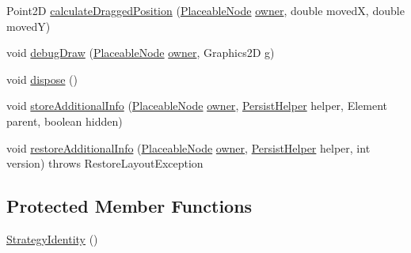\begin{DoxyCompactItemize}
\item 
Point2\-D \hyperlink{classorg_1_1tzi_1_1use_1_1gui_1_1views_1_1diagrams_1_1elements_1_1positioning_1_1_strategy_identity_a8db2a4d3368ef4cd10c42804622a8aca}{calculate\-Dragged\-Position} (\hyperlink{classorg_1_1tzi_1_1use_1_1gui_1_1views_1_1diagrams_1_1elements_1_1_placeable_node}{Placeable\-Node} \hyperlink{classorg_1_1tzi_1_1use_1_1gui_1_1views_1_1diagrams_1_1elements_1_1positioning_1_1_statefull_position_strategy_ac987ea0c7e5b6ddc09cc5afb41043dfd}{owner}, double moved\-X, double moved\-Y)
\item 
void \hyperlink{classorg_1_1tzi_1_1use_1_1gui_1_1views_1_1diagrams_1_1elements_1_1positioning_1_1_strategy_identity_a97fb0c988d565c652e914f80aa77533f}{debug\-Draw} (\hyperlink{classorg_1_1tzi_1_1use_1_1gui_1_1views_1_1diagrams_1_1elements_1_1_placeable_node}{Placeable\-Node} \hyperlink{classorg_1_1tzi_1_1use_1_1gui_1_1views_1_1diagrams_1_1elements_1_1positioning_1_1_statefull_position_strategy_ac987ea0c7e5b6ddc09cc5afb41043dfd}{owner}, Graphics2\-D g)
\item 
void \hyperlink{classorg_1_1tzi_1_1use_1_1gui_1_1views_1_1diagrams_1_1elements_1_1positioning_1_1_strategy_identity_a713177f8c92b7a319c25a66c2163afe4}{dispose} ()
\item 
void \hyperlink{classorg_1_1tzi_1_1use_1_1gui_1_1views_1_1diagrams_1_1elements_1_1positioning_1_1_strategy_identity_a2505e4a79153e367e73e05a2ce84a485}{store\-Additional\-Info} (\hyperlink{classorg_1_1tzi_1_1use_1_1gui_1_1views_1_1diagrams_1_1elements_1_1_placeable_node}{Placeable\-Node} \hyperlink{classorg_1_1tzi_1_1use_1_1gui_1_1views_1_1diagrams_1_1elements_1_1positioning_1_1_statefull_position_strategy_ac987ea0c7e5b6ddc09cc5afb41043dfd}{owner}, \hyperlink{classorg_1_1tzi_1_1use_1_1gui_1_1util_1_1_persist_helper}{Persist\-Helper} helper, Element parent, boolean hidden)
\item 
void \hyperlink{classorg_1_1tzi_1_1use_1_1gui_1_1views_1_1diagrams_1_1elements_1_1positioning_1_1_strategy_identity_a8af6c03c5cf7c7dbdfedbc4a5556e7b3}{restore\-Additional\-Info} (\hyperlink{classorg_1_1tzi_1_1use_1_1gui_1_1views_1_1diagrams_1_1elements_1_1_placeable_node}{Placeable\-Node} \hyperlink{classorg_1_1tzi_1_1use_1_1gui_1_1views_1_1diagrams_1_1elements_1_1positioning_1_1_statefull_position_strategy_ac987ea0c7e5b6ddc09cc5afb41043dfd}{owner}, \hyperlink{classorg_1_1tzi_1_1use_1_1gui_1_1util_1_1_persist_helper}{Persist\-Helper} helper, int version)  throws Restore\-Layout\-Exception 
\end{DoxyCompactItemize}
\subsection*{Protected Member Functions}
\begin{DoxyCompactItemize}
\item 
\hyperlink{classorg_1_1tzi_1_1use_1_1gui_1_1views_1_1diagrams_1_1elements_1_1positioning_1_1_strategy_identity_a6f68dd05eb6fbcbf40bdcc1428c7d5b1}{Strategy\-Identity} ()
\end{DoxyCompactItemize}
